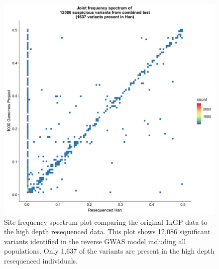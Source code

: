 \documentclass[9pt,lineno]{elife}
\begin{document}
\begin{figure}[h]
\centering
\includegraphics[width=12cm,keepaspectratio]{./Figures/Han_1kGP_SFS_FullModel.jpg}
\caption{Site frequency spectrum plot comparing the original 1kGP data to the high depth resequenced data. 
This plot shows  12,086 significant variants identified in the reverse GWAS model including all populations.
 Only 1,637 of the variants are present in the high depth resequenced individuals.}  
\label{90HanSFS_full}
\end{figure}
\end{document}
